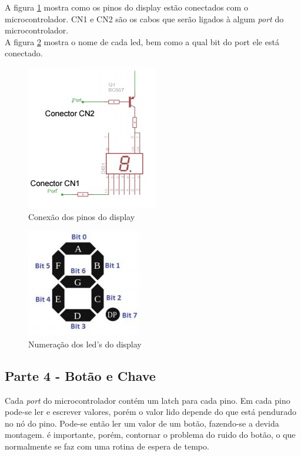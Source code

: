 \documentclass[
    a4paper,
    brazil
    ]{article}
\begin{document}
        A figura \ref{display} mostra como os pinos do display estão conectados com o microcontrolador. CN1 e CN2 são os cabos que serão ligados à algum \emph{port} do microcontrolador.\\
        
        A figura \ref{display_bits} mostra o nome de cada led, bem como a qual bit do port ele está conectado.\\
        
        \begin{figure}[H]
            \centering
            \includegraphics[scale=1]
            {imagens/display_cn.jpg}
            \caption{Conexão dos pinos do display}
            \label{display}
        \end{figure}
            
        \begin{figure}[H]
            \centering
            \includegraphics[scale=1]
            {imagens/display_bits.jpg}
            \caption{Numeração dos led's do display}
            \label{display_bits}
        \end{figure}
            
        
    \subsection{Parte 4 - Botão e Chave}
        Cada \emph{port} do microcontrolador contém um latch para cada pino. Em cada pino pode-se ler e escrever valores, porém o valor lido depende do que está pendurado no nó do pino. Pode-se então ler um valor de um botão, fazendo-se a devida montagem. é importante, porém, contornar o problema do ruido do botão, o que normalmente se faz com uma rotina de espera de tempo. \\
        
\end{document}

